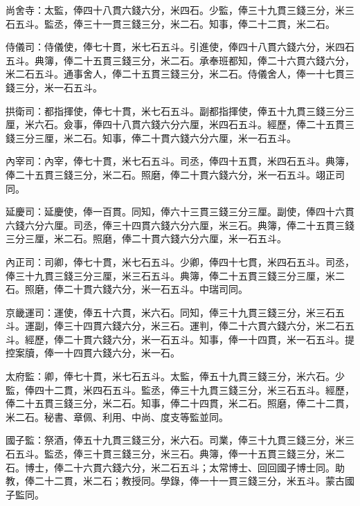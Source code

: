 \begin{pinyinscope}
 尚舍寺：太監，俸四十八貫六錢六分，米四石。少監，俸三十九貫三錢三分，米三石五斗。監丞，俸三十一貫三錢三分，米二石。知事，俸二十二貫，米二石。



 侍儀司：侍儀使，俸七十貫，米七石五斗。引進使，俸四十八貫六錢六分，米四石五斗。典簿，俸二十五貫三錢三分，米二石。承奉班都知，俸二十六貫六錢六分，米二石五斗。通事舍人，俸二十五貫三錢三分，米二石。侍儀舍人，俸一十七貫三錢三分，米一石五斗。



 拱衛司：都指揮使，俸七十貫，米七石五斗。副都指揮使，俸五十九貫三錢三分三厘，米六石。僉事，俸四十八貫六錢六分六厘，米四石五斗。經歷，俸二十五貫三錢三分三厘，米二石。知事，俸二十貫六錢六分六厘，米一石五斗。



 內宰司：內宰，俸七十貫，米七石五斗。司丞，俸四十五貫，米四石五斗。典簿，俸二十五貫三錢三分，米二石。照磨，俸二十貫六錢六分，米一石五斗。翊正司同。



 延慶司：延慶使，俸一百貫。同知，俸六十三貫三錢三分三厘。副使，俸四十六貫六錢六分六厘。司丞，俸三十四貫六錢六分六厘，米三石。典簿，俸二十五貫三錢三分三厘，米二石。照磨，俸二十貫六錢六分六厘，米一石五斗。



 內正司：司卿，俸七十貫，米七石五斗。少卿，俸四十七貫，米四石五斗。司丞，俸三十九貫三錢三分三厘，米三石五斗。典簿，俸二十五貫三錢三分三厘，米二石。照磨，俸二十貫六錢六分，米一石五斗。中瑞司同。



 京畿運司：運使，俸五十六貫，米六石。同知，俸三十九貫三錢三分，米三石五斗。運副，俸三十四貫六錢六分，米三石。運判，俸二十六貫六錢六分，米二石五斗。經歷，俸二十貫六錢六分，米一石五斗。知事，俸一十四貫，米一石五斗。提控案牘，俸一十四貫六錢六分，米一石。



 太府監：卿，俸七十貫，米七石五斗。太監，俸五十九貫三錢三分，米六石。少監，俸四十二貫，米四石五斗。監丞，俸三十九貫三錢三分，米三石五斗。經歷，俸二十五貫三錢三分，米二石。知事，俸二十四貫，米二石。照磨，俸二十二貫，米二石。秘書、章佩、利用、中尚、度支等監並同。



 國子監：祭酒，俸五十九貫三錢三分，米六石。司業，俸三十九貫三錢三分，米三石五斗。監丞，俸三十貫三錢三分，米三石。典簿，俸一十五貫三錢三分，米二石。博士，俸二十六貫六錢六分，米二石五斗；太常博士、回回國子博士同。助教，俸二十二貫，米二石；教授同。學錄，俸一十一貫三錢三分，米五斗。蒙古國子監同。




\end{pinyinscope}
